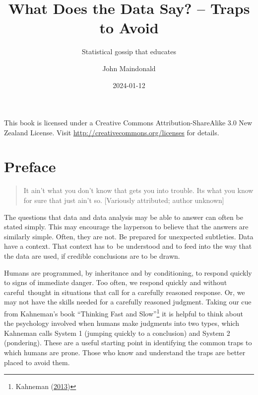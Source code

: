 \documentclass[
  10pt,
  b5paper]{book}
\title{What Does the Data Say? -- Traps to Avoid}
\subtitle{Statistical gossip that educates}
\author{John Maindonald}
\date{2024-01-12}
\begin{document}
\maketitle


This book is licensed under a Creative
Commons Attribution-ShareAlike 3.0 New Zealand License.
Visit \url{http://creativecommons.org/licenses} for details.


{
\hypersetup{linkcolor=}
\setcounter{tocdepth}{1}
\tableofcontents
}
\renewcommand{\bibname}{References}

\hypertarget{preface}{%
\chapter*{Preface}\label{preface}}

\begin{quote}
It ain't what you don't know that gets you into trouble.
Its what you know for sure that just ain't so.
{[}Variously attributed; author unknown{]}
\end{quote}

The questions that data and data analysis may be able to answer can
often be stated simply. This may encourage the layperson to believe
that the answers are similarly simple. Often, they are not. Be
prepared for unexpected subtleties. Data have a context. That
context has to~be understood and to feed into the way that the data
are used, if credible conclusions are to be drawn.

Humans are programmed, by inheritance and by conditioning, to
respond quickly to signs of immediate danger. Too often, we
respond quickly and without careful~thought in situations that
call for a carefully reasoned response. Or, we may not have
the skills needed for a carefully reasoned judgment. Taking
our cue from Kahneman's book ``Thinking Fast and Slow''\footnote{Kahneman (\protect\hyperlink{ref-kahneman_2013}{2013})}
it is helpful to think about the psychology involved when
humans make judgments into two types, which Kahneman calls System 1
(jumping quickly to a conclusion) and System 2 (pondering).
These are a useful starting point in identifying the common traps
to which humans are prone. Those who know and understand the traps
are better placed to avoid them.
\end{document}
